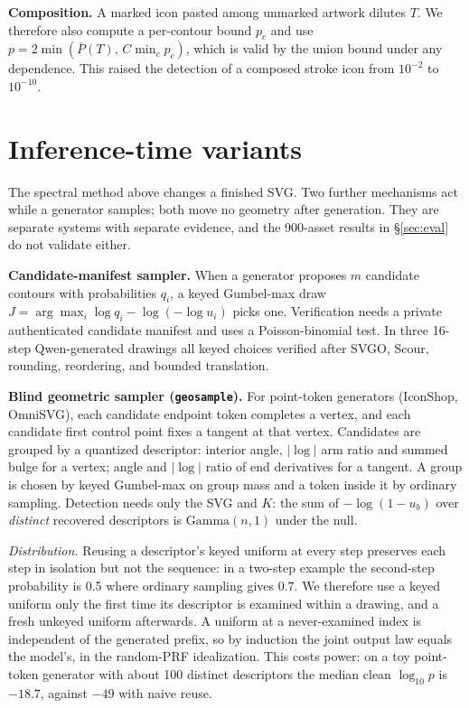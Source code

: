\documentclass[10pt,twocolumn]{article}
\begin{document}
\textbf{Composition.} A marked icon pasted among unmarked artwork dilutes $T$. We therefore also compute a per-contour bound $p_c$ and use $p=2\min(\bar P(T),\,C\min_c p_c)$, which is valid by the union bound under any dependence. This raised the detection of a composed stroke icon from $10^{-2}$ to $10^{-10}$.

\section{Inference-time variants}
\label{sec:gen}
The spectral method above changes a finished SVG. Two further mechanisms act while a generator samples; both move no geometry after generation. They are separate systems with separate evidence, and the 900-asset results in \S\ref{sec:eval} do not validate either.

\textbf{Candidate-manifest sampler.} When a generator proposes $m$ candidate contours with probabilities $q_i$, a keyed Gumbel-max draw $J=\arg\max_i \log q_i-\log(-\log u_i)$ picks one. Verification needs a private authenticated candidate manifest and uses a Poisson-binomial test. In three 16-step Qwen-generated drawings all keyed choices verified after SVGO, Scour, rounding, reordering, and bounded translation.

\textbf{Blind geometric sampler (\texttt{geosample}).} For point-token generators (IconShop, OmniSVG), each candidate endpoint token completes a vertex, and each candidate first control point fixes a tangent at that vertex. Candidates are grouped by a quantized descriptor: interior angle, $|\log|$ arm ratio and summed bulge for a vertex; angle and $|\log|$ ratio of end derivatives for a tangent. A group is chosen by keyed Gumbel-max on group mass and a token inside it by ordinary sampling. Detection needs only the SVG and $K$: the sum of $-\log(1-u_b)$ over \emph{distinct} recovered descriptors is $\mathrm{Gamma}(n,1)$ under the null.

\emph{Distribution.} Reusing a descriptor's keyed uniform at every step preserves each step in isolation but not the sequence: in a two-step example the second-step probability is 0.5 where ordinary sampling gives 0.7. We therefore use a keyed uniform only the first time its descriptor is examined within a drawing, and a fresh unkeyed uniform afterwards. A uniform at a never-examined index is independent of the generated prefix, so by induction the joint output law equals the model's, in the random-PRF idealization. This costs power: on a toy point-token generator with about 100 distinct descriptors the median clean $\log_{10}p$ is $-18.7$, against $-49$ with naive reuse.
\end{document}
